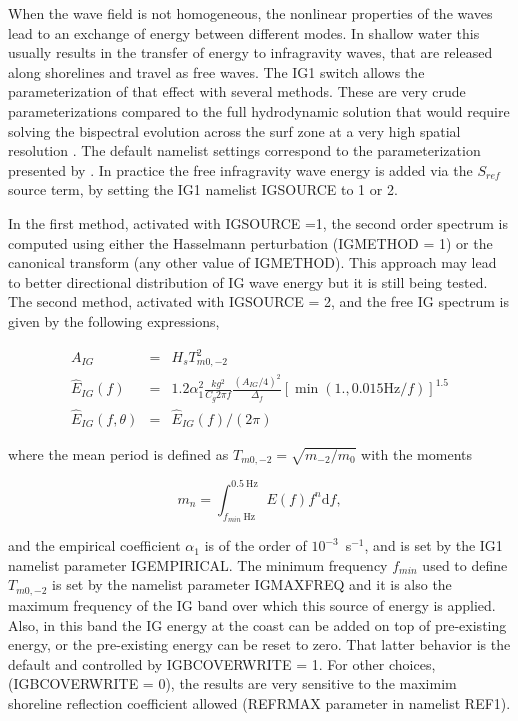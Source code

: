 When the wave field is not homogeneous, the nonlinear properties of the waves
lead to an exchange of energy between different modes. In shallow water this
usually results in the transfer of energy to infragravity waves, that are
released along shorelines and travel as free waves. The {\code IG1} switch
allows the parameterization of that effect with several methods.  These are
very crude parameterizations compared to the full hydrodynamic solution that
would require solving the bispectral evolution across the surf zone at a very
high spatial resolution \citep[e.g.][]{art:HB97}. The default namelist settings
correspond to the parameterization presented by \cite{art:Aea14}.
 In practice the free infragravity wave energy is
added via the $S_{ref}$ source term, by setting the {\code IG1} namelist
{\code IGSOURCE} to 1 or 2.

In the first method, activated with {\code IGSOURCE =1}, the second order
spectrum is computed using either the Hasselmann perturbation ({\code IGMETHOD
= 1}) or the canonical transform (any other value of {\code IGMETHOD}). This
approach may lead to better directional distribution of IG wave energy but it
is still being tested.  The second method, activated with {\code IGSOURCE =
2}, and the free IG spectrum is given by the following expressions,

\begin{eqnarray}
 A_{IG} & =&    H_s T_{m0,-2}^2\label{eq:IGfit0} \\
\widehat{E}_{IG}(f)& = & 1.2 \alpha_1^2 \frac{k g^2}{C_g 2 \pi f} \frac{(A_{IG}/4)^2}{\Delta_f}  
\left[\min( 1., 0.015\mathrm{Hz}/ f)\right]^{1.5} \label{eq:IGfit1} \\
 \widehat{E}_{IG}(f,\theta) & = & \widehat{E}_{IG}(f) / (2 \pi )
\label{eq:fit2} 
\end{eqnarray}

\noindent
where the mean period is defined as $ T_{m0,-2} =\sqrt{m_{-2}/m_{0}}$ with the
moments

\begin{equation}
 m_n= \int_{f_{min}~\mathrm{Hz}}^{0.5~\mathrm{Hz}} E(f) f^n {\mathrm d}f,\label{eq:mn}
\end{equation}

\noindent
and the empirical coefficient $\alpha_1$ is of the order of
$10^{-3}$~s$^{-1}$, and is set by the IG1 namelist parameter {\code
IGEMPIRICAL}. The minimum frequency $f_{min}$ used to define $ T_{m0,-2}$ is
set by the namelist parameter {\code IGMAXFREQ} and it is also the maximum
frequency of the IG band over which this source of energy is applied.  Also,
in this band the IG energy at the coast can be added on top of pre-existing
energy, or the pre-existing energy can be reset to zero. That latter behavior
is the default and controlled by {\code IGBCOVERWRITE = 1}. For other choices,
({\code IGBCOVERWRITE = 0}), the results are very sensitive to the maximim
shoreline reflection coefficient allowed ({\code REFRMAX} parameter in
namelist {\code REF1}).

